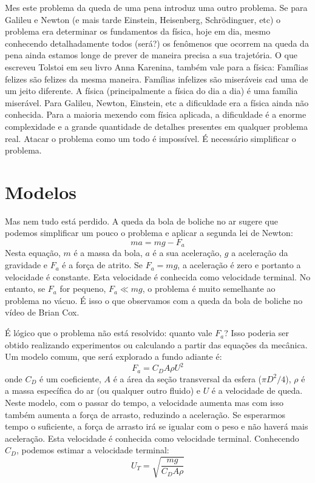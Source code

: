 Mes este problema da queda de uma pena introduz uma outro problema. Se para Galileu e Newton (e mais tarde Einstein, Heisenberg, Schrödinguer, etc) o problema era determinar os fundamentos da física, hoje em dia, mesmo conhecendo detalhadamente todos (será?) os fenômenos que ocorrem na queda da pena ainda estamos longe de prever de maneira precisa a sua trajetória. O que escreveu Tolstoi em seu livro Anna Karenina, também vale para a física: Famílias felizes são felizes da mesma maneira. Famílias infelizes são miseráveis cad uma de um jeito diferente. A física (principalmente a física do dia a dia) é uma família miserável. Para Galileu, Newton, Einstein, etc a dificuldade era a física ainda não conhecida. Para a maioria mexendo com física aplicada, a dificuldade é a enorme complexidade e a grande quantidade de detalhes presentes em qualquer problema real. Atacar o problema como um todo é impossível. É necessário simplificar o problema.

\section{Modelos}

Mas nem tudo está perdido. A queda da bola de boliche no ar sugere que podemos simplificar um pouco o problema e aplicar a segunda lei de Newton:
\[
m a = m g - F_a
\]
Nesta equação, $m$ é a massa da bola, $a$ é a sua aceleração, $g$ a aceleração da gravidade e $F_a$ é a força de atrito. Se $F_a = m g$, a aceleração é zero e portanto a velocidade é constante. Esta velocidade é conhecida como velocidade terminal. No entanto, se $F_a$ for pequeno, $F_a \ll mg$, o problema é muito semelhante ao problema no vácuo. É isso o que observamos com a queda da bola de boliche no vídeo de Brian Cox.

É lógico que o problema não está resolvido: quanto vale $F_a$? Isso poderia ser obtido realizando experimentos ou calculando a partir das equações da mecânica. Um modelo comum, que será explorado a fundo adiante é:
\[
F_a = C_D A \rho U^2
\]
onde $C_D$ é um coeficiente, $A$ é a área da seção transversal da esfera ($\pi D^2 /4$), $\rho$ é a massa específica do ar (ou qualquer outro fluido) e $U$ é a velocidade de queda. Neste modelo, com o passar do tempo, a velocidade aumenta mas com isso também aumenta a força de arrasto, reduzindo a aceleração. Se esperarmos tempo o suficiente, a força de arrasto irá se igualar com o peso e não haverá mais aceleração. Esta velocidade é conhecida como velocidade terminal. Conhecendo $C_D$, podemos estimar a velocidade terminal:
\[
U_T = \sqrt{\frac{ m g}{C_D A \rho}}
\]


